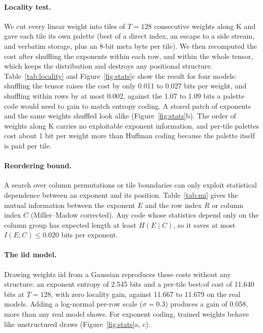 \documentclass[11pt]{article}
\begin{document}
\paragraph{Locality test.} We cut every linear weight into tiles of $T=128$ consecutive weights along K and gave each tile its own palette (best of a direct index, an escape to a side stream, and verbatim storage, plus an 8-bit meta byte per tile). We then recomputed the cost after shuffling the exponents within each row, and within the whole tensor, which keeps the distribution and destroys any positional structure. Table~\ref{tab:locality} and Figure~\ref{fig:stats}c show the result for four models: shuffling the tensor raises the cost by only 0.011 to 0.027 bits per weight, and shuffling within rows by at most 0.002, against the 1.07 to 1.09 bits a palette code would need to gain to match entropy coding. A stored patch of exponents and the same weights shuffled look alike (Figure~\ref{fig:stats}b). The order of weights along K carries no exploitable exponent information, and per-tile palettes cost about 1 bit per weight more than Huffman coding because the palette itself is paid per tile.

\begin{table}[t]
\centering
\caption{Per-tile palette cost in bits per weight (linear layers, $T=128$), on real and shuffled exponents.}
\label{tab:locality}

\end{table}

\paragraph{Reordering bound.} A search over column permutations or tile boundaries can only exploit statistical dependence between an exponent and its position. Table~\ref{tab:mi} gives the mutual information between the exponent $E$ and the row index $R$ or column index $C$ (Miller--Madow corrected). Any code whose statistics depend only on the column group has expected length at least $H(E \mid C)$, so it saves at most $I(E;C) \le 0.020$ bits per exponent.

\begin{table}[t]
\centering
\caption{Exponent entropy and its mutual information with the row and column index, bits per exponent.}
\label{tab:mi}

\end{table}

\paragraph{The iid model.} Drawing weights iid from a Gaussian reproduces these costs without any structure: an exponent entropy of 2.545 bits and a per-tile best-of cost of 11.640 bits at $T=128$, with zero locality gain, against 11.667 to 11.679 on the real models. Adding a log-normal per-row scale ($\sigma = 0.3$) produces a gain of 0.058, more than any real model shows. For exponent coding, trained weights behave like unstructured draws (Figure~\ref{fig:stats}a, c).
\end{document}
